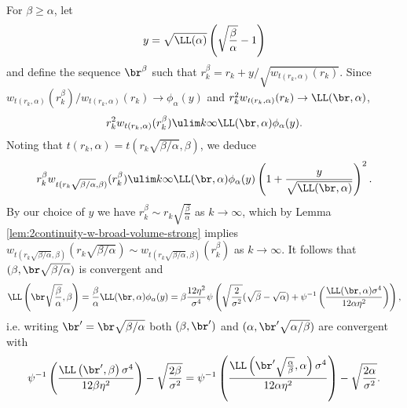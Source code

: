 \documentclass[10pt,a4paper]{article}
\begin{document}
For $\beta \geq \alpha$, let
\[ y = \sqrt{\LL(\alpha)}\left(\sqrt{\frac{\beta}{\alpha}} -1\right) \]
and define the sequence $\br^\beta$ such that $r^\beta_k = r_k + y / \sqrt{w_{t(r_k, \alpha)}(r_k)}$. Since $w_{t(r_k,\alpha)}(r^\beta_k) / w_{t(r_k,\alpha)}(r_k) \to \phi_\alpha(y)$ and $r_k^2 w_{t(r_k,\alpha)}(r_k) \to \LL(\br,\alpha)$, 
\begin{align*}
r_k^2 w_{t(r_k,\alpha)}(r^\beta_k) \ulim k \infty \LL(\br,\alpha) \phi_\alpha(y) . 
\end{align*}
Noting that $t(r_k, \alpha) = t(r_k\sqrt{\beta/\alpha}, \beta)$, %
we deduce
\begin{equation*}%
r^\beta_k w_{t(r_k\sqrt{\beta/\alpha},\beta)}(r^\beta_k) \ulim k \infty \LL(\br,\alpha)\phi_\alpha(y) \left( 1 + \frac{y}{\sqrt{\LL(\br,\alpha)}} \right)^2 .
\end{equation*}
By our choice of $y$ we have $r^\beta_k \sim r_k \sqrt{\frac{\beta}{\alpha}}$ as $k\to\infty$, which by Lemma \ref{lem:2continuity-w-broad-volume-strong}
implies $w_{t(r_k \sqrt{\beta/\alpha}, \beta)}(r_k\sqrt{\beta/\alpha}) \sim w_{t(r_k\sqrt{\beta/\alpha}, \beta)}(r^\beta_k)$ as $k\to\infty$. 
It follows that $(\beta, \br \sqrt{\beta/\alpha})$ is convergent and 
\begin{align*}
\LL\left(\br\sqrt{\frac{\beta}{\alpha}}, \beta\right) 
= \frac{\beta}{\alpha} \LL(\br,\alpha)\phi_\alpha(y) 
= \beta \frac{12 \eta^2}{\sigma^4} \psi\left( \sqrt{\frac{2}{\sigma^2}} (\sqrt{\beta} - \sqrt{\alpha}) + \psi^{-1}\left( \frac{\LL(\br, \alpha) \sigma^4}{12 \alpha \eta^2} \right) \right) ,
\end{align*} 
i.e. writing $\br' = \br\sqrt{\beta/\alpha}$ both $(\beta,\br')$ and $(\alpha, \br'\sqrt{\alpha/\beta})$ are convergent with 
\begin{equation}\label{eq:LL-when-beta-larger-alpha}
\psi^{-1}\left( \frac{\LL\left(\br', \beta\right) \sigma^4}{12\beta\eta^2} \right) - \sqrt{\frac{2\beta}{\sigma^2}} = \psi^{-1}\left( \frac{\LL\left(\br' \sqrt{\frac{\alpha}{\beta}}, \alpha\right) \sigma^4}{12\alpha\eta^2} \right) - \sqrt{\frac{2\alpha}{\sigma^2}} .
\end{equation}
\end{document}
